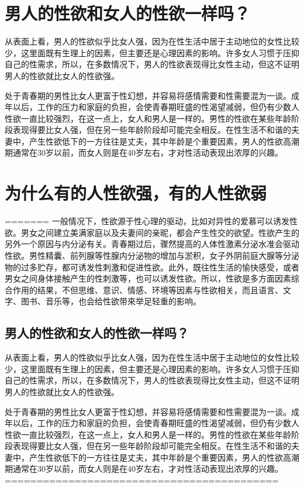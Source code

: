 \documentclass[12pt,UTF8]{ctexbook}
\begin{document}
\chapter{男人的性欲和女人的性欲一样吗？}

从表面上看，男人的性欲似乎比女人强，因为在性生活中居于主动地位的女性比较少，这里面既有生理上的因素，但主要还是心理因素的影响。许多女人习惯于压抑自己的性需求，所以，在多数情况下，男人的性欲表现得比女性主动，但这不证明男人的性欲就比女人的性欲强。

处于青春期的男性比女人更富于性幻想，并容易将感情需要和性需要混为一谈。成年以后，工作的压力和家庭的负担，会使青春期旺盛的性渴望减弱，但仍有少数人性欲一直比较强烈，在这一点上，女人和男人是一样的。男性的性欲在某些年龄阶段表现得要比女人强，但在另一些年龄阶段却可能完全相反。在性生活不和谐的夫妻中，产生性欲低下的一方往往是丈夫，其中年龄是个重要因素，男人的性欲高潮期通常在30岁以前，而女人则是在40岁左右，才对性活动表现出浓厚的兴趣。

\chapter{为什么有的人性欲强，有的人性欲弱}
=======
一般情况下，性欲源于性心理的驱动，比如对异性的爱慕可以诱发性欲。男女之间建立美满家庭以及夫妻间的亲昵，都会产生性交的欲望。性欲产生的另外一个原因与内分泌有关。青春期过后，骤然提高的人体性激素分泌水准会驱动性欲。男性精囊、前列腺等性腺内分泌物的增加与淤积，女子外阴前庭大腺等分泌物的过多贮存，都可诱发性刺激和促进性欲。此外，既往性生活的愉快感受，或者男女之间身体接触产生的性刺激等，也可以诱发性欲。所以，性欲是多方面因素综合作用的结果，不但思维、意识、情感、环境等因素与性欲相关，而且语言、文字、图书、音乐等，也会给性欲带來举足轻重的影响。

\section{男人的性欲和女人的性欲一样吗？}

从表面上看，男人的性欲似乎比女人强，因为在性生活中居于主动地位的女性比较少，这里面既有生理上的因素，但主要还是心理因素的影响。许多女人习惯于压抑自己的性需求，所以，在多数情况下，男人的性欲表现得比女性主动，但这不证明男人的性欲就比女人的性欲强。

处于青春期的男性比女人更富于性幻想，并容易将感情需要和性需要混为一谈。成年以后，工作的压力和家庭的负担，会使青春期旺盛的性渴望减弱，但仍有少数人性欲一直比较强烈，在这一点上，女人和男人是一样的。男性的性欲在某些年龄阶段表现得要比女人强，但在另一些年龄阶段却可能完全相反。在性生活不和谐的夫妻中，产生性欲低下的一方往往是丈夫，其中年龄是个重要因素，男人的性欲高潮期通常在30岁以前，而女人则是在40岁左右，才对性活动表现出浓厚的兴趣。
===========================================
\end{document}
